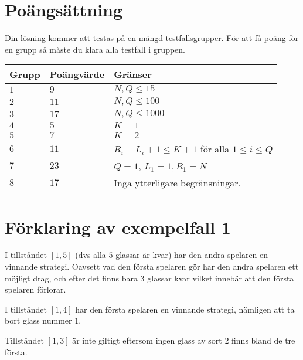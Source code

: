 \section*{Poängsättning}
Din lösning kommer att testas på en mängd testfallsgrupper.
För att få poäng för en grupp så måste du klara alla testfall i gruppen.

\noindent
\begin{tabular}{| l | l | p{12cm} |}
  \hline
  Grupp & Poängvärde & Gränser \\ \hline
  $1$   & $9$        & $N,Q \le 15$ \\ \hline
  $2$   & $11$       & $N,Q \le 100$ \\ \hline
  $3$   & $17$       & $N,Q \le 1000$ \\ \hline
  $4$   & $5$        & $K=1$ \\ \hline
  $5$   & $7$        & $K=2$ \\ \hline
  $6$   & $11$       & $R_i - L_i + 1 \le K+1$ för alla $1 \le i \le Q$ \\ \hline
  $7$   & $23$       & $Q=1$, $L_1=1, R_1=N$ \\ \hline
  $8$   & $17$       & Inga ytterligare begränsningar. \\ \hline
\end{tabular}


\section*{Förklaring av exempelfall 1}
I tillståndet $[1,5]$ (dvs alla $5$ glassar är kvar) har den andra spelaren en vinnande strategi. 
Oavsett vad den första spelaren gör har den andra spelaren ett möjligt drag, och efter det finns bara $3$ glassar kvar
vilket innebär att den första spelaren förlorar.

I tillståndet $[1,4]$ har den första spelaren en vinnande strategi, nämligen att ta bort glass nummer $1$.

Tillståndet $[1,3]$ är inte giltigt eftersom ingen glass av sort $2$ finns bland de tre första.

